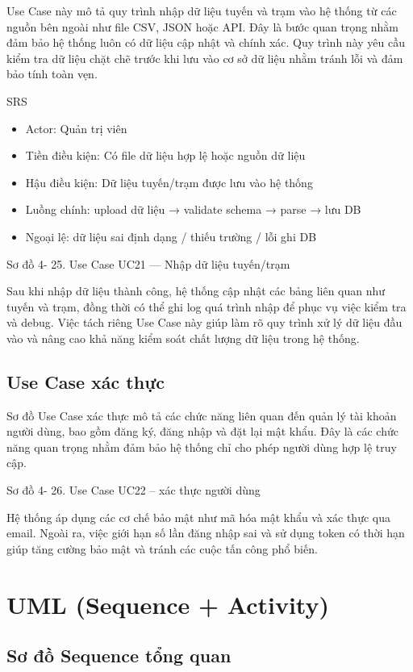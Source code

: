 \documentclass[13pt,a4paper]{report}
\begin{document}
Use Case này mô tả quy trình nhập dữ liệu tuyến và trạm vào hệ thống từ các nguồn bên ngoài như file CSV, JSON hoặc API. Đây là bước quan trọng nhằm đảm bảo hệ thống luôn có dữ liệu cập nhật và chính xác. Quy trình này yêu cầu kiểm tra dữ liệu chặt chẽ trước khi lưu vào cơ sở dữ liệu nhằm tránh lỗi và đảm bảo tính toàn vẹn.

SRS

\begin{itemize}
    \item Actor: Quản trị viên
    \item Tiền điều kiện: Có file dữ liệu hợp lệ hoặc nguồn dữ liệu
    \item Hậu điều kiện: Dữ liệu tuyến/trạm được lưu vào hệ thống
    \item Luồng chính: upload dữ liệu → validate schema → parse → lưu DB
    \item Ngoại lệ: dữ liệu sai định dạng / thiếu trường / lỗi ghi DB
\end{itemize}

Sơ đồ 4- 25. Use Case UC21 — Nhập dữ liệu tuyến/trạm

Sau khi nhập dữ liệu thành công, hệ thống cập nhật các bảng liên quan như tuyến và trạm, đồng thời có thể ghi log quá trình nhập để phục vụ việc kiểm tra và debug. Việc tách riêng Use Case này giúp làm rõ quy trình xử lý dữ liệu đầu vào và nâng cao khả năng kiểm soát chất lượng dữ liệu trong hệ thống.

\subsection{Use Case xác thực}

Sơ đồ Use Case xác thực mô tả các chức năng liên quan đến quản lý tài khoản người dùng, bao gồm đăng ký, đăng nhập và đặt lại mật khẩu. Đây là các chức năng quan trọng nhằm đảm bảo hệ thống chỉ cho phép người dùng hợp lệ truy cập.

Sơ đồ 4- 26. Use Case UC22  -- xác thực người dùng

Hệ thống áp dụng các cơ chế bảo mật như mã hóa mật khẩu và xác thực qua email. Ngoài ra, việc giới hạn số lần đăng nhập sai và sử dụng token có thời hạn giúp tăng cường bảo mật và tránh các cuộc tấn công phổ biến.

\section{UML (Sequence + Activity)}

\subsection{Sơ đồ Sequence tổng quan}
\end{document}
